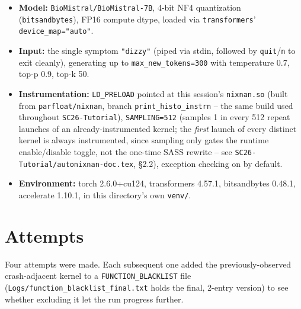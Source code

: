 \documentclass[11pt]{article}
\begin{document}
\begin{itemize}
  \item \textbf{Model:} \texttt{BioMistral/\allowbreak BioMistral-7B}, 4-bit NF4
    quantization (\texttt{bitsandbytes}), FP16 compute dtype, loaded via
    \texttt{transformers}' \texttt{device\_map="auto"}.
  \item \textbf{Input:} the single symptom \texttt{"dizzy"} (piped via
    stdin, followed by \texttt{quit}/\texttt{n} to exit cleanly), generating
    up to \texttt{max\_new\_tokens=300} with temperature 0.7, top-p 0.9,
    top-k 50.
  \item \textbf{Instrumentation:} \texttt{LD\_PRELOAD} pointed at this
    session's \texttt{nixnan.so} (built from
    \texttt{parfloat/\allowbreak nixnan}, branch \texttt{print\_histo\_\allowbreak instrn} -- the
    same build used throughout \texttt{SC26-Tutorial}), \texttt{SAMPLING=512}
    (samples 1 in every 512 repeat launches of an already-instrumented
    kernel; the \emph{first} launch of every distinct kernel is always
    instrumented, since sampling only gates the runtime enable/disable
    toggle, not the one-time SASS rewrite -- see
    \texttt{SC26-Tutorial/\allowbreak autonixnan-doc.tex}, \S2.2), exception
    checking on by default.
  \item \textbf{Environment:} torch 2.6.0+cu124, transformers 4.57.1,
    bitsandbytes 0.48.1, accelerate 1.10.1, in this directory's own
    \texttt{venv/}.
\end{itemize}

\section{Attempts}

Four attempts were made. Each subsequent one added the previously-observed
crash-adjacent kernel to a \texttt{FUNCTION\_BLACKLIST} file
(\texttt{Logs/function\_blacklist\_final.txt} holds the final, 2-entry
version) to see whether excluding it let the run progress further.
\end{document}

